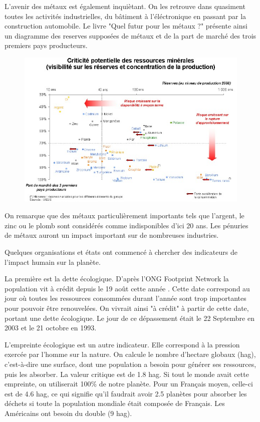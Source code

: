 L'avenir des métaux est également inquiètant. On les retrouve dans quasiment toutes les activités industrielles, du bâtiment à l'éléctronique en passant par la construction automobile. Le livre "Quel futur pour les métaux ?" \cite{LivreFuturMetaux} présente ainsi un diagramme des reserves supposées de métaux et de la part de marché des trois premiers pays producteurs.

\begin{figure}[h]
\includegraphics[scale=0.75]{./Rsc/risquemetaux.jpg}
\end{figure} 


On remarque que des métaux particulièrement importants tels que l'argent, le zinc ou le plomb sont considérés comme indisponibles d'ici 20 ans. Les pénuries de métaux auront un impact important sur de nombreuses industries.

\smallbreak Quelques organisations et états ont commencé à chercher des indicateurs de l'impact humain sur la planète.

La première est la dette écologique. D'après l'ONG Footprint Network la population vit à crédit depuis le 19 août cette année \cite{DateACredit}. Cette date correspond au jour où toutes les ressources consommées durant l'année sont trop importantes pour pouvoir être renouvelées. On vivrait ainsi "à crédit" à partir de cette date, portant une dette écologique. Le jour de ce dépassement était le 22 Septembre en 2003 et le 21 octobre en 1993.

L'empreinte écologique est un autre indicateur. Elle correspond à la pression exercée par l'homme sur la nature. On calcule le nombre d'hectare globaux (hag), c'est-à-dire une surface, dont une population a besoin pour générer ses ressources, puis les absorber. La valeur critique est de 1.8 hag. Si tout le monde avait cette empreinte, on utiliserait 100\% de notre planète. Pour un Français moyen, celle-ci est de 4.6 hag, ce qui signifie qu'il faudrait avoir 2.5 planètes pour absorber les déchets si toute la population mondiale était composée de Français. Les Américains ont besoin du double (9 hag).

